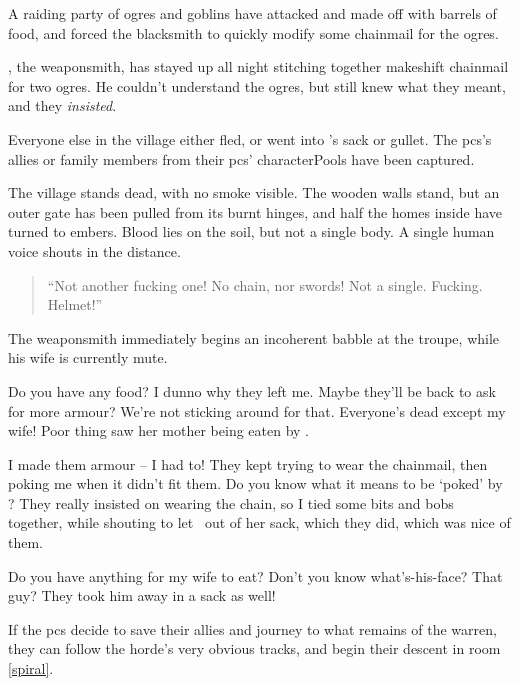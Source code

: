 \begin{exampletext}
  A raiding party of \glspl{ogre} and goblins have attacked  and made off with barrels of food, and forced the blacksmith to quickly modify some chainmail for the \glspl{ogre}.
\end{exampletext}

\composeHumanName, the weaponsmith, has stayed up all night stitching together makeshift chainmail for two \glspl{ogre}.
He couldn't understand the \glspl{ogre}, but still knew what they meant, and they \emph{insisted}.

Everyone else in the \gls{village} either fled, or went into 's sack or gullet.
The \glspl{pc}'s allies or family members from their \glspl{pc}' \glspl{characterPool} have been captured.

\begin{boxtext}
  The \gls{village} stands dead, with no smoke visible.
  The wooden walls stand, but an outer gate has been pulled from its burnt hinges, and half the homes inside have turned to embers.
  Blood lies on the soil, but not a single body.
  A single human voice shouts in the distance.

  \begin{quotation}
    ``Not another fucking one!
    No chain, nor swords!
    Not a single. Fucking. Helmet!''
  \end{quotation}
\end{boxtext}


The weaponsmith immediately begins an incoherent babble at the troupe, while his wife is currently mute.

\begin{speechtext}
  Do you have any food?
  I dunno why they left me.
  Maybe they'll be back to ask for more armour?
  We're not sticking around for that.
  Everyone's dead except my wife!
  Poor thing saw her mother being eaten by .

  I made them armour -- I had to!
  They kept trying to wear the chainmail, then poking me when it didn't fit them.
  Do you know what it means to be `poked' by ?
  They really insisted on wearing the chain, so I tied some bits and bobs together, while shouting to let \composeHumanName\ out of her sack, which they did, which was nice of them.

  Do you have anything for my wife to eat?
  Don't you know what's-his-face?
  That guy?
  They took him away in a sack as well!
\end{speechtext}

If the \glspl{pc} decide to save their allies and journey to what remains of the \gls{warren}, they can follow the horde's very obvious tracks, and begin their descent in room \vref{spiral}.
